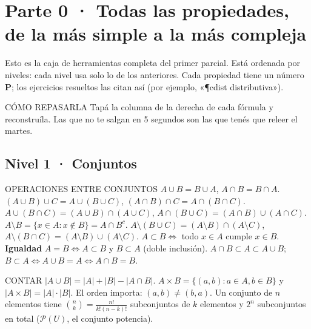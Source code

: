 \chapter*{Parte 0 · Todas las propiedades, de la más simple a la más compleja}

Esto es la caja de herramientas completa del primer parcial. Está ordenada por niveles: cada nivel usa solo lo de los anteriores. Cada propiedad tiene un número \textbf{P}; los ejercicios resueltos las citan así (por ejemplo, «\P{cdist} distributiva»).

\begin{tip}{CÓMO REPASARLA}
Tapá la columna de la derecha de cada fórmula y reconstruíla. Las que no te salgan en 5 segundos son las que tenés que releer el martes.
\end{tip}

\section*{Nivel 1 · Conjuntos}
\begin{sello}{OPERACIONES ENTRE CONJUNTOS}
 $A\cup B=B\cup A$, \quad $A\cap B=B\cap A$.
 $(A\cup B)\cup C=A\cup(B\cup C)$, \quad $(A\cap B)\cap C=A\cap(B\cap C)$.
 $A\cup(B\cap C)=(A\cup B)\cap(A\cup C)$, \quad $A\cap(B\cup C)=(A\cap B)\cup(A\cap C)$.
 $A\setminus B=\{x\in A: x\notin B\}=A\cap B^c$.
 $A\setminus(B\cup C)=(A\setminus B)\cap(A\setminus C)$, \quad $A\setminus(B\cap C)=(A\setminus B)\cup(A\setminus C)$.
 $A\subset B\iff$ todo $x\in A$ cumple $x\in B$. \textbf{Igualdad} $A=B\iff A\subset B$ y $B\subset A$ (doble inclusión).
 $A\cap B\subset A\subset A\cup B$; \ $B\subset A\iff A\cup B=A\iff A\cap B=B$.
\end{sello}
\begin{sello}{CONTAR}
 $|A\cup B|=|A|+|B|-|A\cap B|$.
 $A\times B=\{(a,b):a\in A,b\in B\}$ y $|A\times B|=|A|\cdot|B|$. El orden importa: $(a,b)\neq(b,a)$.
 Un conjunto de $n$ elementos tiene $\binom{n}{k}=\frac{n!}{k!(n-k)!}$ subconjuntos de $k$ elementos y $2^n$ subconjuntos en total ($\mathcal P(U)$, el conjunto potencia).
\end{sello}

